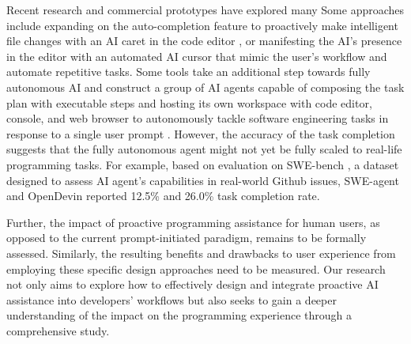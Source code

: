 Recent research and commercial prototypes have explored many 
Some approaches include expanding on the auto-completion feature to proactively make intelligent file changes with an AI caret in the code editor \cite{cursorcopilot++}, or manifesting the AI's presence in the editor with an automated AI cursor \cite{geniusbydiagram} that mimic the user's workflow and automate repetitive tasks.
Some tools take an additional step towards fully autonomous AI and construct a group of AI agents capable of composing the task plan with executable steps and hosting its own workspace with code editor, console, and web browser to autonomously tackle software engineering tasks in response to a single user prompt \cite{devinAISWE, wang2024opendevinopenplatformai, yang2024sweagentagentcomputerinterfacesenable}.
However, the accuracy of the task completion suggests that the fully autonomous agent might not yet be fully scaled to real-life programming tasks. For example, based on evaluation on SWE-bench \cite{jimenez2024swebenchlanguagemodelsresolve}, a dataset designed to assess AI agent's capabilities in real-world Github issues, SWE-agent and OpenDevin reported 12.5\% and 26.0\% task completion rate.

Further, the impact of proactive programming assistance for human users, as opposed to the current prompt-initiated paradigm, remains to be formally assessed.
Similarly, the resulting benefits and drawbacks to user experience from employing these specific design approaches need to be measured.
Our research not only aims to explore how to effectively design and integrate proactive AI assistance into developers' workflows but also seeks to gain a deeper understanding of the impact on the programming experience through a comprehensive study.


